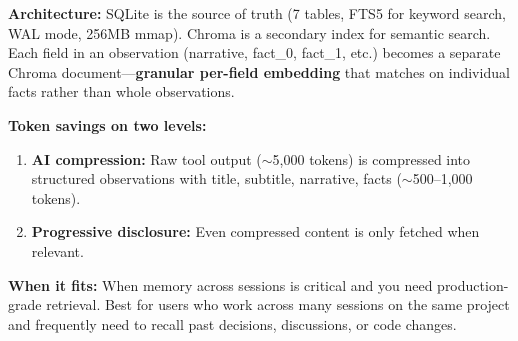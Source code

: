 \documentclass[11pt,a4paper]{article}
\begin{document}
\begin{center}
\end{center}

\textbf{Architecture:} SQLite is the source of truth (7 tables, FTS5 for keyword search, WAL mode, 256MB mmap). Chroma is a secondary index for semantic search. Each field in an observation (narrative, fact\_0, fact\_1, etc.) becomes a separate Chroma document---\textbf{granular per-field embedding} that matches on individual facts rather than whole observations.

\textbf{Token savings on two levels:}
\begin{enumerate}
  \item \textbf{AI compression:} Raw tool output ($\sim$5,000 tokens) is compressed into structured observations with title, subtitle, narrative, facts ($\sim$500--1,000 tokens).
  \item \textbf{Progressive disclosure:} Even compressed content is only fetched when relevant.
\end{enumerate}

\textbf{When it fits:} When memory across sessions is critical and you need production-grade retrieval. Best for users who work across many sessions on the same project and frequently need to recall past decisions, discussions, or code changes.
\end{document}
